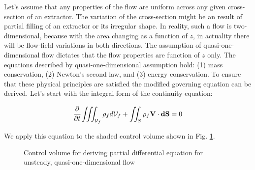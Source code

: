 \documentclass[../Parameter_fitting.tex]{subfiles}
\begin{document}
	
	\label{CH: Gouverning equations}
	
	Let's assume that any properties of the flow are uniform across any given cross-section of an extractor. The variation of the cross-section might be an result of partial filling of an extractor or its irregular shape. In reality, such a flow is two-dimensional, because with the area changing as a function of $z$, in actuality there will be flow-field variations in both directions. The assumption of quasi-one-dimensional flow dictates that the flow properties are function of $z$ only. The equations described by quasi-one-dimensional assumption hold: (1) mass conservation, (2) Newton's second law, and (3) energy conservation. To ensure that these physical principles are satisfied the modified governing equation can be derived.	Let's start with the integral form of the continuity equation:
	
	{\footnotesize
		\begin{equation}
			\cfrac{\partial}{\partial t} \iiint_{\mathcal{V}_f} \rho_f d\mathcal{V}_f + \iint_S \rho_f \textbf{V} \cdot \textbf{dS} = 0
			\label{EQ: Continuity_integral_general}
		\end{equation}
	}
	
	We apply this equation to the shaded control volume shown in Fig. \ref{fig: control_volume}. 
	
	\begin{figure}[h]
		\centering
		\caption{Control volume for deriving partial differential equation for unsteady, quasi-one-dimensional flow}
		\label{fig: control_volume}
	\end{figure}
	
\end{document}
